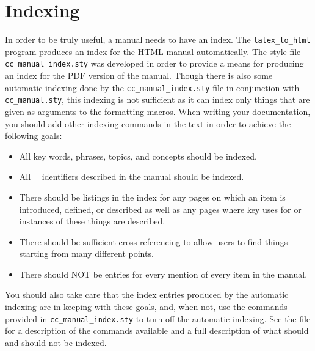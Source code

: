 \section{Indexing\label{sec:indexing}}

In order to be truly useful, a manual needs to have an index.  The
{\tt latex\_to\_html} program produces an index for the HTML manual
automatically.  %
The style file {\tt cc\_manual\_index.sty}%
 was developed in order to provide
a means for producing an index for the PDF version of the manual.
Though there is also some automatic indexing done by the
{\tt cc\_manual\_index.sty} file in conjunction with {\tt cc\_manual.sty},
this indexing is not sufficient as it can index only things that are
given as arguments to the formatting macros.  When writing your
documentation, you should add other indexing commands in the text in
order to achieve the following goals:
\begin{itemize}
   \item All key words, phrases, topics, and concepts should be indexed.
   \item All \cgal\ \CC\ identifiers described in the manual should be indexed.
   \item There should be listings in the index for any pages on which an
         item is introduced, defined, or described as well as any pages
         where key uses for or instances of these things are described.
   \item There should be sufficient cross referencing to allow users
         to find things starting from many different points.
   \item There should NOT be entries for every mention of every item in the
         manual.
\end{itemize}

You should also take care that the index entries produced by the automatic
indexing are in keeping with these goals, and, when not, use the commands
provided in {\tt cc\_manual\_index.sty} to turn off the automatic indexing.
See the file 
for a description of the commands available and a full description of what
should and should not be indexed.



